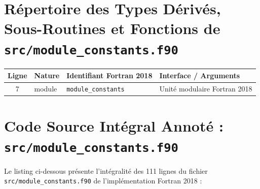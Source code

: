 \documentclass[10pt,a4paper,oneside]{book}
\begin{document}
\section{Répertoire des Types Dérivés, Sous-Routines et Fonctions de \texttt{src/module\_constants.f90}}
\begin{center}\small
\begin{tabular}{clll}
\toprule
\textbf{Ligne} & \textbf{Nature} & \textbf{Identifiant Fortran 2018} & \textbf{Interface / Arguments} \\
\midrule
7 & module & \texttt{module\_constants} & Unité modulaire Fortran 2018 \\
\bottomrule
\end{tabular}
\end{center}

\section{Code Source Intégral Annoté : \texttt{src/module\_constants.f90}}
Le listing ci-dessous présente l'intégralité des 111 lignes du fichier \texttt{src/module\_constants.f90} de l'implémentation Fortran 2018 :
\end{document}
